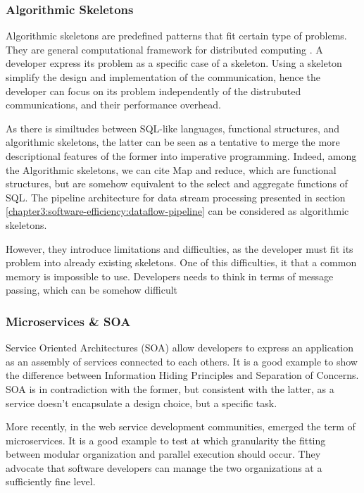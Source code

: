 \subsubsection{Algorithmic Skeletons}

Algorithmic skeletons are predefined patterns that fit certain type of problems.
They are general computational framework for distributed computing \cite{Cole1988, McCool2010, Gonzalez-Velez2010}.
A developer express its problem as a specific case of a skeleton.
Using a skeleton simplify the design and implementation of the communication, hence the developer can focus on its problem independently of the distrubuted communications, and their performance overhead.

As there is similtudes between SQL-like languages, functional structures, and algorithmic skeletons, the latter can be seen as a tentative to merge the more descriptional features of the former into imperative programming.
Indeed, among the Algorithmic skeletons, we can cite Map and reduce, which are functional structures, but are somehow equivalent to the select and aggregate functions of SQL.
The pipeline architecture for data stream processing presented in section \ref{chapter3:software-efficiency:dataflow-pipeline} can be considered as algorithmic skeletons.

However, they introduce limitations and difficulties, as the developer must fit its problem into already existing skeletons.
One of this difficulties, it that a common memory is impossible to use.
Developers needs to think in terms of message passing, which can be somehow difficult 

\subsubsection{Microservices \& SOA}

Service Oriented Architectures (SOA) allow developers to express an application as an assembly of services connected to each others.
It is a good example to show the difference between Information Hiding Principles and Separation of Concerns.
SOA is in contradiction with the former, but consistent with the latter, as a service doesn't encapsulate a design choice, but a specific task.

More recently, in the web service development communities, emerged the term of microservices.
It is a good example to test at which granularity the fitting between modular organization and parallel execution should occur.
They advocate that software developers can manage the two organizations at a sufficiently fine level.

